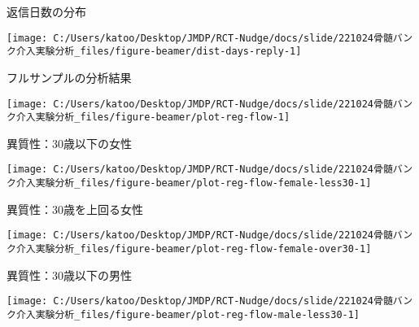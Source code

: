 \documentclass[
      aspectratio=169,
        12pt,
    ]{beamer}
\begin{document}
\begin{frame}{返信日数の分布}
\protect\hypertarget{ux8fd4ux4fe1ux65e5ux6570ux306eux5206ux5e03}{}
\begin{center}\texttt{[image: C:/Users/katoo/Desktop/JMDP/RCT-Nudge/docs/slide/221024骨髄バンク介入実験分析\_files/figure-beamer/dist-days-reply-1]} \end{center}
\end{frame}

\begin{frame}{フルサンプルの分析結果}
\protect\hypertarget{ux30d5ux30ebux30b5ux30f3ux30d7ux30ebux306eux5206ux6790ux7d50ux679c}{}
\begin{center}\texttt{[image: C:/Users/katoo/Desktop/JMDP/RCT-Nudge/docs/slide/221024骨髄バンク介入実験分析\_files/figure-beamer/plot-reg-flow-1]} \end{center}
\end{frame}

\begin{frame}{異質性：30歳以下の女性}
\protect\hypertarget{ux7570ux8ceaux602730ux6b73ux4ee5ux4e0bux306eux5973ux6027}{}
\begin{center}\texttt{[image: C:/Users/katoo/Desktop/JMDP/RCT-Nudge/docs/slide/221024骨髄バンク介入実験分析\_files/figure-beamer/plot-reg-flow-female-less30-1]} \end{center}
\end{frame}

\begin{frame}{異質性：30歳を上回る女性}
\protect\hypertarget{ux7570ux8ceaux602730ux6b73ux3092ux4e0aux56deux308bux5973ux6027}{}
\begin{center}\texttt{[image: C:/Users/katoo/Desktop/JMDP/RCT-Nudge/docs/slide/221024骨髄バンク介入実験分析\_files/figure-beamer/plot-reg-flow-female-over30-1]} \end{center}
\end{frame}

\begin{frame}{異質性：30歳以下の男性}
\protect\hypertarget{ux7570ux8ceaux602730ux6b73ux4ee5ux4e0bux306eux7537ux6027}{}
\begin{center}\texttt{[image: C:/Users/katoo/Desktop/JMDP/RCT-Nudge/docs/slide/221024骨髄バンク介入実験分析\_files/figure-beamer/plot-reg-flow-male-less30-1]} \end{center}
\end{frame}
\end{document}
